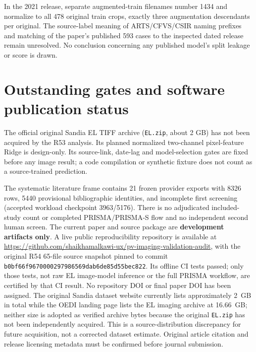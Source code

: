 \documentclass[10pt,a4paper]{article}
\begin{document}
In the 2021 release, separate augmented-train filenames number 1434 and normalize to all 478 original train crops, exactly three augmentation descendants per original. The source-label meaning of ARTS/CFVS/CSIR naming prefixes and matching of the paper's published 593 cases to the inspected dated release remain unresolved. No conclusion concerning any published model's split leakage or score is drawn.

\section{Outstanding gates and software publication status}
The official original Sandia EL TIFF archive (\texttt{EL.zip}, about 2 GB) has not been acquired by the R53 analysis. Its planned normalized two-channel pixel-feature Ridge is design-only. Its source-link, date-lag and model-selection gates are fixed before any image result; a code compilation or synthetic fixture does not count as a source-trained prediction.

The systematic literature frame contains 21 frozen provider exports with 8326 rows, 5440 provisional bibliographic identities, and incomplete first screening (accepted workload checkpoint 3963/5176). There is no adjudicated included-study count or completed PRISMA/PRISMA-S flow and no independent second human screen. The current paper and source package are \textbf{development artifacts only}. A live public reproducibility repository is available at \url{https://github.com/shaikhamalkawi-ux/pv-imaging-validation-audit}, with the original R54 65-file source snapshot pinned to commit \texttt{b0bf66f9670000297986569dab6de85d55bec822}. Its offline CI tests passed; only those tests, not raw EL image-model inference or the full PRISMA workflow, are certified by that CI result. No repository DOI or final paper DOI has been assigned. The original Sandia dataset website currently lists approximately 2~GB in total while the OEDI landing page lists the EL imaging archive at 16.66~GB; neither size is adopted as verified archive bytes because the original \texttt{EL.zip} has not been independently acquired. This is a source-distribution discrepancy for future acquisition, not a corrected dataset estimate. Original article citation and release licensing metadata must be confirmed before journal submission.
\end{document}
